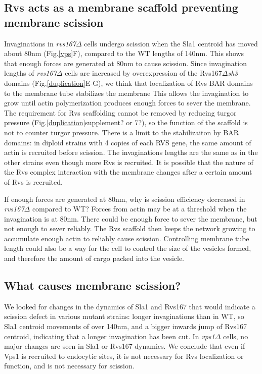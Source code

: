 \documentclass[9pt,lineno]{elife}
\begin{document}
\subsection{Rvs acts as a membrane scaffold preventing membrane scission}
Invaginations in \textit{rvs167$\Delta$} cells undergo scission when the Sla1 centroid has moved about 80nm (Fig.\ref{vps}F), compared to the WT lengths of 140nm. This shows that enough forces are generated at 80nm to cause scission. Since invagination lengths of \textit{rvs167$\Delta$} cells are increased by overexpression of the Rvs167\textit{$\Delta$sh3} domains (Fig.\ref{duplication}E-G), we think that localization of Rvs BAR domains to the membrane tube stabilizes the  membrane \citep{Boucrot2012,Dmitrieff2015} This allows the invagination to grow until actin polymerization produces enough forces to sever the membrane. The requirement for Rvs scaffolding cannot be removed by reducing turgor pressure (Fig.\ref{duplication}supplement? or 7?),  so the function of the scaffold is not to counter turgor pressure. There is a limit to the stabilizaiton by BAR domains: in diploid strains with 4 copies of each RVS gene, the same amount of actin is recruited before scission. The invaginations lengths are the same as in the other strains even though more Rvs is recruited. It is possible that the nature of the Rvs complex interaction with the membrane changes after a certain amount of Rvs is recruited. 

If enough forces are generated at 80nm, why is scission efficiency decreased in \textit{rvs167$\Delta$}  compared to WT? Forces from actin may be at a threshold when the invagination is at 80nm. There could be enough force to sever the membrane, but not enough to sever reliably. The Rvs scaffold then keeps the network growing to accumulate enough actin to reliably cause scission. Controlling membrane  tube length could also be a way for the cell to control the size of the vesicles formed, and therefore the amount of cargo packed into the vesicle. 

\subsection{What causes membrane scission?}
We looked for changes in the dynamics of Sla1 and Rvs167 that would indicate a scission defect in various mutant strains: longer invaginations than in WT, so Sla1 centroid movements of over 140nm, and a bigger inwards jump of Rvs167 centroid, indicating that a longer invagination has been cut. In \textit{vps1$\Delta$}  cells, no major changes are seen in Sla1 or Rvs167 dynamics. We conclude that even if Vps1 is recruited to endocytic sites, it is not necessary for Rvs localization or function, and is not necessary for scission. 
\end{document}
